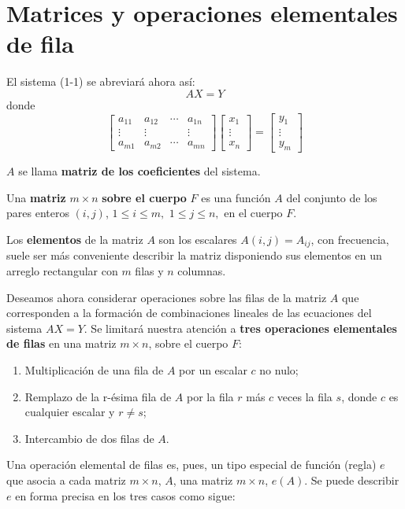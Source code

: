 \section{Matrices y operaciones elementales de fila}
El sistema (1-1) se abreviará ahora así:
$$AX=Y$$
donde 
$$
\left[\begin{array}{cccc}
    a_{11} & a_{12} & \cdots & a_{1n} \\
    \vdots & \vdots &  & \vdots \\
    a_{m1} & a_{m2} & \cdots & a_{mn}
\end{array}\right]
\left[\begin{array}{c}
	x_1 \\
	\vdots \\
	x_n
\end{array}\right] = 
\left[\begin{array}{c}
	y_1 \\
	\vdots \\
	y_m
\end{array}\right]
$$

$A$ se llama \textbf{matriz de los coeficientes} del sistema.

    Una \textbf{matriz} $m\times n$ \textbf{sobre el cuerpo} $F$ es una función $A$ del conjunto de los pares enteros $(i,j)$, $1\leq i \leq m,$ $1\leq j \leq n,$ en el cuerpo $F$.

    Los \textbf{elementos} de la matriz $A$ son los escalares $A(i,j)=A_{ij}$, con frecuencia, suele ser más conveniente describir la matriz disponiendo sus elementos en un arreglo rectangular con $m$ filas y $n$ columnas.

Deseamos ahora considerar operaciones sobre las filas de la matriz $A$ que corresponden a la formación de combinaciones lineales de las ecuaciones del sistema $AX=Y$. Se limitará nuestra atención a \textbf{tres operaciones elementales de filas} en una matriz $m\times n$, sobre el cuerpo $F$:

    \begin{enumerate}[\bfseries 1.]
	\item Multiplicación de una fila de $A$ por un escalar $c$ no nulo;
	\item Remplazo de la r-ésima fila de $A$ por la fila $r$ más $c$ veces la fila $s$, donde $c$ es cualquier escalar y $r\neq s$;
	\item Intercambio de dos filas de $A$.
    \end{enumerate}

Una operación elemental de filas es, pues, un tipo especial de función (regla) $e$ que asocia a cada matriz $m\times n$, $A$, una matriz $m\times n$, $e(A)$. Se puede describir $e$ en forma precisa en los tres casos como sigue:

